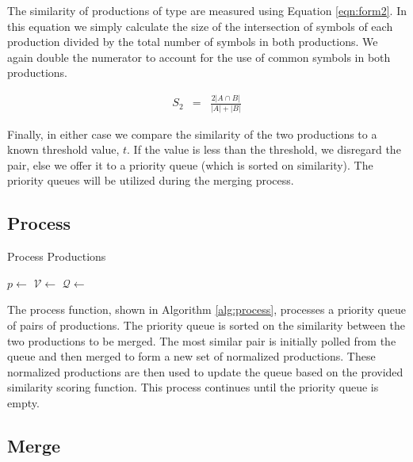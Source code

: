 \documentclass[10pt,nocc]{xrese_report}
\begin{document}
The similarity of productions of type  are measured using Equation \ref{eqn:form2}. In this equation we simply calculate the size of the intersection of symbols of each production divided by the total number of symbols in both productions. We again double the numerator to account for the use of common symbols in both productions.

\begin{eqnarray}\label{eqn:form2}
 S_2 & = & \frac{2|A \cap B|}{|A| + |B|}
\end{eqnarray}


Finally, in either case we compare the similarity of the two productions to a known threshold value, $t$. If the value is less than the threshold, we disregard the pair, else we offer it to a priority queue (which is sorted on similarity). The priority queues will be utilized during the merging process.

\subsection{Process}

\begin{algorithm}[tb]
\caption{Process Productions}\label{alg:process}
 \begin{algorithmic}[1]
      \State $p \gets$ 
      \State $\mathcal{V} \gets$ 
      \State $\mathcal{Q} \gets$ 
    \EndWhile
  \EndFunction
 \end{algorithmic}
\end{algorithm}

The process function, shown in Algorithm \ref{alg:process}, processes a priority queue of pairs of productions. The priority queue is sorted on the similarity between the two productions to be merged. The most similar pair is initially polled from the queue and then merged to form a new set of normalized productions. These normalized productions are then used to update the queue based on the provided similarity scoring function. This process continues until the priority queue is empty.

\subsection{Merge}
\end{document}
